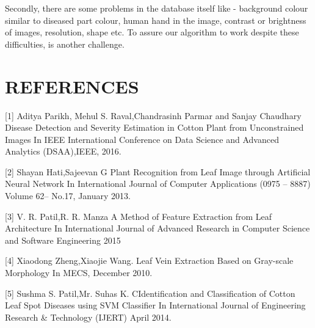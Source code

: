 \documentclass[conference]{IEEEtran}
\begin{document}
\vspace{3mm}

Secondly, there are some problems in the database itself like - background colour similar to diseased part colour, human hand in the image, contrast or brightness of images, resolution, shape etc. To assure our algorithm to work despite these difficulties, is another challenge.
 
\bigskip
\bigskip
\bigskip
\bigskip
\bigskip
\bigskip
\bigskip
\bigskip
\bigskip
\bigskip
\bigskip
\bigskip
\section*{REFERENCES}
[1] Aditya Parikh, Mehul S. Raval,Chandrasinh Parmar and Sanjay Chaudhary Disease Detection and Severity Estimation in Cotton Plant from Unconstrained Images In IEEE International Conference on Data Science and Advanced Analytics (DSAA),IEEE, 2016.

\vspace{5mm}

[2] Shayan Hati,Sajeevan G Plant Recognition from Leaf Image through Artificial
Neural Network In International Journal of Computer Applications (0975 – 8887)
Volume 62– No.17, January 2013.

\vspace{5mm}

[3] V. R. Patil,R. R. Manza A Method of Feature Extraction from Leaf Architecture In International Journal of Advanced Research in
Computer Science and Software Engineering 2015

\vspace{5mm}

[4] Xiaodong Zheng,Xiaojie Wang. Leaf Vein Extraction Based on Gray-scale Morphology In MECS, December 2010.

\vspace{5mm}

[5] Sushma S. Patil,Mr. Suhas K. CIdentification and Classification of Cotton Leaf Spot Diseases using SVM Classifier In International Journal of Engineering Research \& Technology (IJERT) April 2014.


\addtolength{\textheight}{-12cm}  
\end{document}
